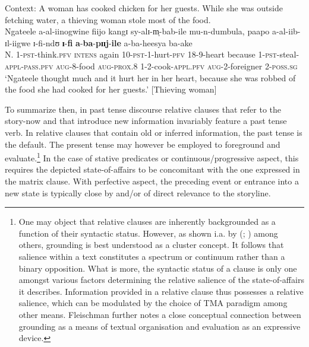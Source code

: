 \begin{exe}
\ex Context: A woman has cooked chicken for her guests. While she was outside fetching water, a thieving woman stole most of the food.\\
\gll Ngateele a-al-iinogwine fiijo kangɪ sy-alɪ-m̩-bab-ile mu-n-dumbula, paapo a-al-iib-ɪl-iigwe ɪ-fi-ndʊ \textbf{ɪ}-\textbf{fi} \textbf{a}-\textbf{ba}-\textbf{pɪɪj}-\textbf{ile} a-ba-heesya ba-ake\\
N. 1-\textsc{pst}-think.\textsc{pfv} \textsc{intens} again 10-\textsc{pst}-1-hurt-\textsc{pfv} 18-9-heart because 1-\textsc{pst}-steal-\textsc{appl}-\textsc{pass.pfv} \textsc{aug}-8-food \textsc{aug}-\textsc{prox.8} 1-2-cook-\textsc{appl.pfv} \textsc{aug}-2-foreigner 2-\textsc{poss.sg}\\
\glt \lq Ngateele thought much and it hurt her in her heart, because she was robbed of the food she had cooked for her guests.' [Thieving woman]
\end{exe}

To summarize then, in past tense  discourse relative clauses that refer to the story-now and that introduce new information invariably feature a past tense verb. In relative clauses that contain old or inferred information, the past tense is the default. The present tense may however be 
employed to foreground and evaluate.\footnote{One may object that relative clauses are inherently backgrounded as a function of their syntactic status. However, as shown i.a. by \citeauthor{FleischmanS1985} (\citeyear{FleischmanS1985}; \citeyear[ch. 6]{FleischmanS1990}) among others, grounding is best understood as a cluster concept. It follows that salience within a text constitutes a spectrum or continuum rather than a binary opposition. What is more, the syntactic status of a clause is only one amongst various factors determining the relative salience of the state-of-affairs it describes. Information provided in a relative clause thus possesses a relative salience, which can be modulated by the choice of TMA paradigm among other means. Fleischman further notes a close conceptual connection between grounding as a means of textual organisation and evaluation as an expressive device.} In the case of stative predicates or continuous/progressive aspect, this requires the depicted state-of-affairs to be concomitant with the one expressed in the matrix clause. With perfective aspect, the preceding event or entrance into a new state is typically close by and/or of direct relevance to the storyline.

